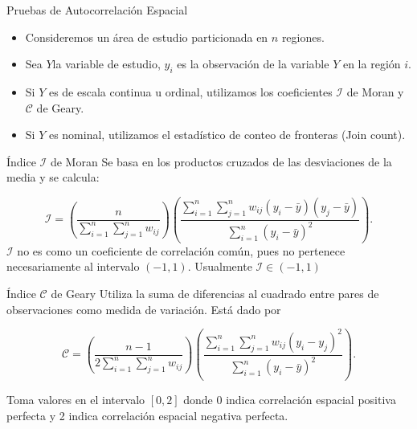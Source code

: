 \documentclass{beamer}
\begin{document}


\begin{frame}{Pruebas de Autocorrelación Espacial}
  \begin{itemize}
    \item Consideremos un área de estudio particionada en $n$ regiones. 
    \item Sea $Y$la variable de estudio, $y_i$ es la observación de la variable $Y$ en la región $i$.
    \item Si $Y$ es de escala continua u ordinal, utilizamos los coeficientes $\mathcal{I}$ de Moran y $\mathcal{C}$ de Geary.
    \item Si $Y$ es nominal, utilizamos el estadístico de conteo de fronteras (Join count).
  \end{itemize}
\end{frame}

\begin{frame}{Índice $\mathcal{I}$ de Moran}
Se basa en los productos cruzados de las desviaciones de la media y se calcula:

\begin{equation}
\mathcal{I} = \left( \dfrac{n}{ \sum_{i=1}^n \sum_{j=1}^n w_{ij}} \right) \left( \dfrac{\sum_{i=1}^n \sum_{j=1}^n w_{ij} (y_{i} - \bar{y}) (y_{j} - \bar{y}) }{ \sum_{i=1}^n (y_{i} - \bar{y})^2} \right).
\end{equation}
$\mathcal{I}$ no es como un coeficiente de correlación común, pues no pertenece necesariamente al intervalo $(-1,1)$. Usualmente $\mathcal{I} \in (-1,1)$
\end{frame}

\begin{frame}{Índice $\mathcal{C}$ de Geary}
Utiliza la suma de diferencias al cuadrado entre pares de observaciones como medida de variación. Está dado por

\begin{equation}
\mathcal{C} =  \left(\dfrac{n-1}{ 2 \sum_{i=1}^n \sum_{j=1}^n w_{ij}}\right)  \left( \dfrac{ \sum_{i=1}^n \sum_{j=1}^n w_{ij} (y_{i} - y_{j})^2}{ \sum_{i=1}^n (y_{i} - \bar{y})^2}\right).
\end{equation}

Toma valores en el intervalo $[0,2]$ donde 0 indica correlación espacial positiva perfecta y 2 indica correlación espacial negativa perfecta. 
\end{frame}
\end{document}
